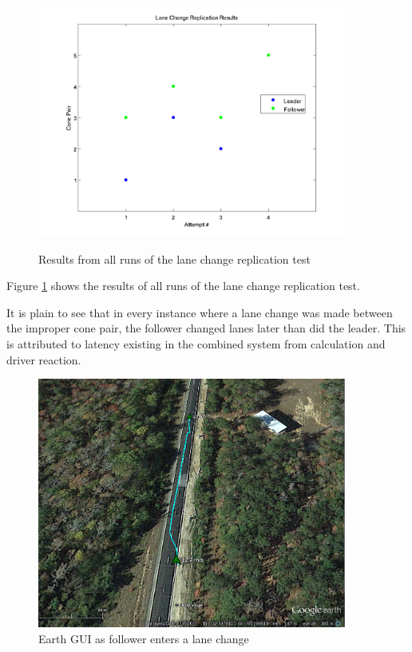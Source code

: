 \begin{figure}[ht] \caption{Results from all runs of the lane change replication test} \centering \label{fig:lanechangeresults}
    \includegraphics[width=4in]{./figs/lane_change_results.png}
\end{figure}

Figure \ref{fig:lanechangeresults} shows the results of all runs of the lane change replication test.

It is plain to see that in every instance where a lane change was made between the improper cone pair, the follower changed lanes later than did the leader. This is attributed to latency existing in the combined system from calculation and driver reaction.

\begin{figure}[ht] \centering
    \includegraphics[width=4in]{./figs/lane_change.png}
    \caption{Earth GUI as follower enters a lane change} \label{fig:lanechange_earth}
\end{figure}

